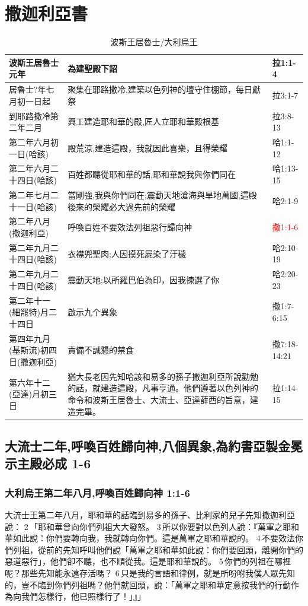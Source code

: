 \chapter{撒迦利亞書}
\begin{table}[H]
\centering 
\begin{tabular}{p{}|p{8.5cm}|p{2.5cm}}\hline\hline
波斯王居魯士元年&為建聖殿下詔&拉1:1-4\\\hline
居魯士?年七月初一日起&聚集在耶路撒冷,建築以色列神的壇守住棚節，每日獻祭&拉3:1-7\\\hline
到耶路撒冷第二年二月&興工建造耶和華的殿,匠人立耶和華殿根基&拉3:8-13\\\hline
第二年六月初一日(哈該)&殿荒涼,建造這殿，我就因此喜樂，且得榮耀&哈1:1-12\\\hline
第二年六月二十四日(哈該)&百姓都聽從耶和華的話,耶和華說我與你們同在&哈1:13-15\\\hline
第二年七月二十一日(哈該)&當剛強,我與你們同在;震動天地滄海與旱地萬國,這殿後來的榮耀必大過先前的榮耀&哈2:1-9\\\hline
第二年八月(撒迦利亞)&呼喚百姓不要效法列祖惡行歸向神&\textcolor{red}{撒1:1-6}\\\hline
第二年九月二十四日(哈該)&衣襟兜聖肉;人因摸死屍染了汙穢&哈2:10-19\\\hline
第二年九月二十四日(哈該)&震動天地;以所羅巴伯為印，因我揀選了你&哈2:20-23\\\hline
第二年十一(細罷特)月二十四日&啟示九个異象&撒1:7-6:15\\\hline
第四年九月(基斯流)初四日(撒迦利亞)&責備不誠懇的禁食&撒7:18-14:21\\\hline
第六年十二(亞達)月初三日&猶大長老因先知哈該和易多的孫子撒迦利亞所說勸勉的話，就建造這殿，凡事亨通。他們遵著以色列神的命令和波斯王居魯士、大流士、亞達薛西的旨意，建造完畢。&拉1:14-15\\\hline
\end{tabular}
\caption{波斯王居魯士/大利烏王}
\end{table}

\section{大流士二年,呼喚百姓歸向神,八個異象,為約書亞製金冕示主殿必成 1-6}
\subsection{大利烏王第二年八月,呼喚百姓歸向神 1:1-6 }
大流士王第二年八月，耶和華的話臨到易多的孫子、比利家的兒子先知撒迦利亞說： 2 「耶和華曾向你們列祖大大發怒。 3 所以你要對以色列人說：『萬軍之耶和華如此說：你們要轉向我，我就轉向你們。這是萬軍之耶和華說的。 4 不要效法你們列祖，從前的先知呼叫他們說「萬軍之耶和華如此說：你們要回頭，離開你們的惡道惡行」，他們卻不聽，也不順從我。這是耶和華說的。 5 你們的列祖在哪裡呢？那些先知能永遠存活嗎？ 6 只是我的言語和律例，就是所吩咐我僕人眾先知的，豈不臨到你們列祖嗎？他們就回頭，說：「萬軍之耶和華定意按我們的行動作為向我們怎樣行，他已照樣行了！」』」


